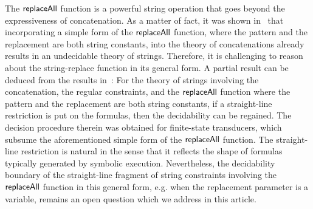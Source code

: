 



The $\mathsf{replaceAll}$ function is a powerful string operation that goes beyond the expressiveness of concatenation. As a matter of fact, it was shown in~\cite{LB16} that incorporating a simple form of the $\mathsf{replaceAll}$ function, where the pattern and the replacement are both string constants, into the theory of concatenations already results in an undecidable theory of strings.  
Therefore, it is challenging to reason about the string-replace function in its general form. 
A partial result can be deduced from the results in~\cite{LB16}: For the theory of strings involving the concatenation, the regular constraints, and the $\mathsf{replaceAll}$ function where the pattern and the replacement are both string constants, if a straight-line restriction is put on the formulas, then the decidability can be regained. The decision procedure therein was obtained for finite-state transducers, which subsume the aforementioned simple form of the $\mathsf{replaceAll}$ function.  The straight-line restriction is natural in the sense that it reflects the shape of formulas typically generated by symbolic execution.
Nevertheless, the decidability boundary of the straight-line fragment of string constraints involving the $\mathsf{replaceAll}$ function in this general form, e.g. when the replacement parameter is a variable, remains an open question which we address in this article.

